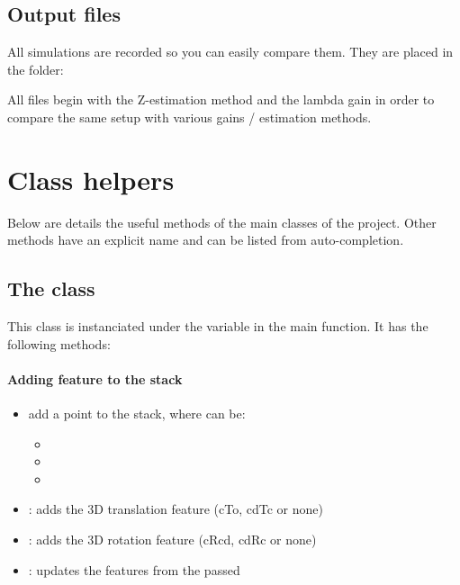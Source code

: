 \documentclass{ecnreport}
\begin{document}
\subsection{Output files}

All simulations are recorded so you can easily compare them. They are placed in the folder:
\begin{center}
\end{center}
All files begin with the Z-estimation method and the lambda gain in order to compare the same setup with various gains / estimation methods.



\newpage
\appendix

\section{Class helpers}

Below are details the useful methods of the main classes of the project. Other methods have an explicit name and can be listed from auto-completion.

\subsection{The  class}\label{app:stack}

This class is instanciated under the variable  in the main function. It has the following methods:
\paragraph{Adding feature to the stack}
\begin{itemize}
 \item  {}
 add a point to the stack, where  can be:
 \begin{itemize}
  \item {}
  \item {}
  \item {}
 \end{itemize}
  \item  {}: adds the 3D translation feature (cTo, cdTc or none)
  \item  {}: adds the 3D rotation feature (cRcd, cdRc or none)
  \item  {}: updates the features from the passed 
\end{itemize}
\end{document}
